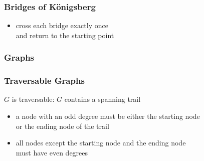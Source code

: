 \documentclass[dvipsnames]{beamer}
\begin{document}
\begin{frame}
  \frametitle{Bridges of Königsberg}

  \begin{center}
  \end{center}

  \begin{itemize}
    \item cross each bridge exactly once\\
      and return to the starting point
  \end{itemize}
\end{frame}

\begin{frame}
  \frametitle{Graphs}

  \begin{center}
  \end{center}
\end{frame}

\begin{frame}
  \frametitle{Traversable Graphs}

  \begin{definition}
    $G$ is \alert{traversable}: $G$ contains a spanning trail
  \end{definition}

  \begin{itemize}
    \item a node with an odd degree must be either the starting node\\
      or the ending node of the trail
    \item all nodes except the starting node and the ending node\\
      must have even degrees
  \end{itemize}
\end{frame}
\end{document}
